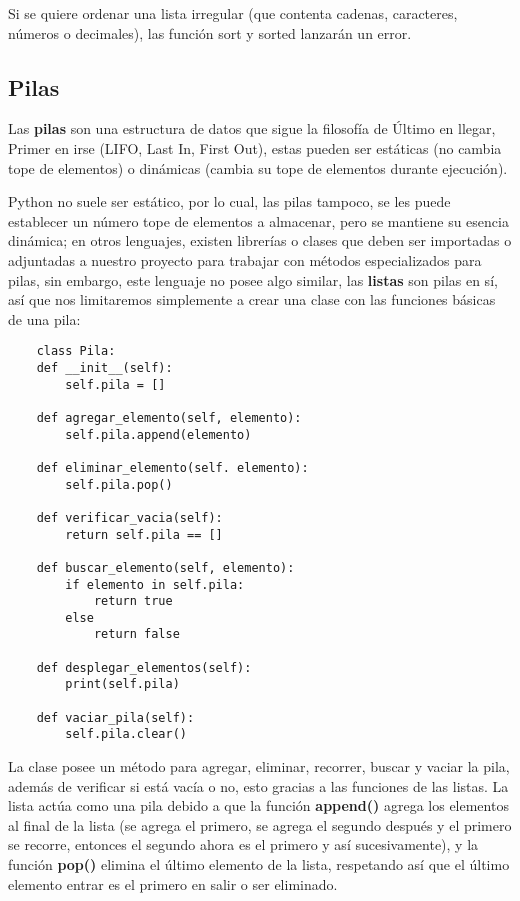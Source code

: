 Si se quiere ordenar una lista irregular (que contenta cadenas, caracteres, números o decimales), las función sort y sorted lanzarán un error.


\subsection{Pilas}

Las \textbf{pilas} son una estructura de datos que sigue la filosofía de Último en llegar, Primer en irse (LIFO, Last In, First Out), estas pueden ser estáticas (no cambia tope de elementos) o dinámicas (cambia su tope de elementos durante ejecución).

Python no suele ser estático, por lo cual, las pilas tampoco, se les puede establecer un número tope de elementos a almacenar, pero se mantiene su esencia dinámica; en otros lenguajes, existen librerías o clases que deben ser importadas o adjuntadas a nuestro proyecto para trabajar con métodos especializados para pilas, sin embargo, este lenguaje no posee algo similar, las \textbf{listas} son pilas en sí, así que nos limitaremos simplemente a crear una clase con las funciones básicas de una pila:
\begin{lstlisting}
    class Pila:
	def __init__(self):
		self.pila = []

	def agregar_elemento(self, elemento):
		self.pila.append(elemento)

	def eliminar_elemento(self. elemento):
		self.pila.pop()

	def verificar_vacia(self):
		return self.pila == []

	def buscar_elemento(self, elemento):
		if elemento in self.pila:
			return true
		else
			return false

	def desplegar_elementos(self):
		print(self.pila)

	def vaciar_pila(self):
		self.pila.clear()
\end{lstlisting}

La clase posee un método para agregar, eliminar, recorrer, buscar y vaciar la pila, además de verificar si está vacía o no, esto gracias a las funciones de las listas. La lista actúa como una pila debido a que la función \textbf{append()} agrega los elementos al final de la lista (se agrega el primero, se agrega el segundo después y el primero se recorre, entonces el segundo ahora es el primero y así sucesivamente), y la función \textbf{pop()} elimina el último elemento de la lista, respetando así que el último elemento entrar es el primero en salir o ser eliminado.


